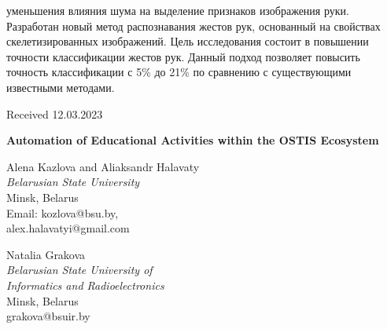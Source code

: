 \documentclass[twocolumn]{article}
\begin{document}
уменьшения влияния шума на выделение признаков
изображения руки. Разработан новый метод распознавания жестов рук, основанный на свойствах скелетизированных изображений. Цель исследования состоит
в повышении точности классификации жестов рук.
Данный подход позволяет повысить точность классификации с 5\%
до 21\%
по сравнению с существующими
известными методами.\\
\begin{flushright}
Received 12.03.2023
\end{flushright}
\newpage
\onecolumn
\begin{center}
\Huge
{}
\textbf{Automation of Educational Activities within
the OSTIS Ecosystem}
\singlespacing
\end{center}
\begin{multicols}{2}
\raggedright
\Large
 \hspace{0.5cm} Alena Kazlova and Aliaksandr Halavaty\\
 \hspace{2cm} \textit{Belarusian State University}\\
 \hspace{3.5cm}  Minsk, Belarus\\
  \hspace{2.5cm} Email: kozlova@bsu.by,\\
   \hspace{2.2cm} alex.halavatyi@gmail.com
\columnbreak

\raggedleft
\Large
 Natalia Grakova  \ \ \ \ \ \ \ \ \ \ \ \ \ \ \ \ \ \ \ \ \\ 
 \textit{Belarusian State University of}\ \ \ \ \ \  \ \ \ \ \\
 \textit{Informatics and Radioelectronics}\ \ \ \ \ \ \ \ \ \\
 Minsk, Belarus \ \ \ \ \ \ \ \ \ \ \ \ \ \ \ \ \ \ \  \\ 
 grakova@bsuir.by \ \ \ \ \ \ \ \ \ \ \ \ \ \ \ \
\end{multicols}
\end{document}
